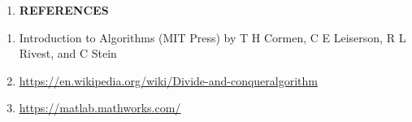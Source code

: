 \documentclass[14pt]{article}
\renewcommand{\_}{\kern-1.5pt\textunderscore\kern-1.5pt}
\begin{document}
\begin{multicols}{2}
\begin{enumerate}
\vspace{\baselineskip}

\vspace{\baselineskip}

\vspace{\baselineskip}

\vspace{\baselineskip}
	\item {\fontsize{15pt}{18.0pt}\selectfont \textbf{REFERENCES}}
\end{enumerate}

\vspace{\baselineskip}
\begin{enumerate}
	\item Introduction to Algorithms (MIT Press) by T H Cormen, C E Leiserson, R L Rivest, and C Stein 
	\item \href{https://en.wikipedia.org/wiki/Divide-and-conquer_algorithm}{\textcolor[HTML]{1155CC}{\ul{https://en.wikipedia.org/wiki/Divide-and-conquer\_algorithm}}}
	\item \href{https://matlab.mathworks.com/}{\textcolor[HTML]{1155CC}{\ul{https://matlab.mathworks.com/}}}
\end{enumerate}

\vspace{\baselineskip}

\vspace{\baselineskip}

\vspace{\baselineskip}

\vspace{\baselineskip}

\end{multicols}
\printbibliography
\end{document}
